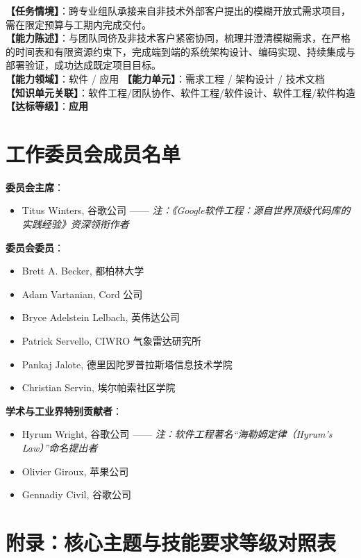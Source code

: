 \begin{taskbox}[任务 11：面向开放式综合工程项目的跨角色协同设计与敏捷交付]
\textbf{【任务情境】}：跨专业组队承接来自非技术外部客户提出的模糊开放式需求项目，需在限定预算与工期内完成交付。\\
\textbf{【能力陈述】}：与团队同侪及非技术客户紧密协同，梳理并澄清模糊需求，在严格的时间表和有限资源约束下，完成端到端的系统架构设计、编码实现、持续集成与部署验证，成功达成既定项目目标。\\
\textbf{【能力领域】}：软件 / 应用 \quad \textbf{【能力单元】}：需求工程 / 架构设计 / 技术文档\\
\textbf{【知识单元关联】}：软件工程/团队协作、软件工程/软件设计、软件工程/软件构造 \quad \textbf{【达标等级】}：\textbf{应用}
\end{taskbox}

\section{工作委员会成员名单}

\textbf{委员会主席}：
\begin{itemize}
    \item Titus Winters, 谷歌公司 —— \emph{注：《Google软件工程：源自世界顶级代码库的实践经验》资深领衔作者}
\end{itemize}

\textbf{委员会委员}：
\begin{itemize}
    \item Brett A. Becker, 都柏林大学
    \item Adam Vartanian, Cord 公司
    \item Bryce Adelstein Lelbach, 英伟达公司
    \item Patrick Servello, CIWRO 气象雷达研究所
    \item Pankaj Jalote, 德里因陀罗普拉斯塔信息技术学院
    \item Christian Servin, 埃尔帕索社区学院
\end{itemize}

\textbf{学术与工业界特别贡献者}：
\begin{itemize}
    \item Hyrum Wright, 谷歌公司 —— \emph{注：软件工程著名“海勒姆定律（Hyrum's Law）”命名提出者}
    \item Olivier Giroux, 苹果公司
    \item Gennadiy Civil, 谷歌公司
\end{itemize}

\clearpage
\onecolumn
\section{附录：核心主题与技能要求等级对照表}

